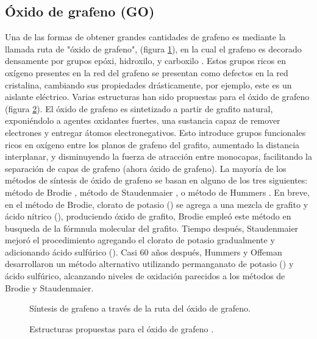 \subsection{Óxido de grafeno (GO)}
Una de las formas de obtener grandes cantidades de grafeno es mediante la llamada ruta de "óxido de grafeno", (figura \ref{fig:graphiteToRGO}), en la cual el grafeno es decorado densamente por grupos epóxi, hidroxilo, y carboxilo \citep{Dreyer2010}. Estos grupos ricos en oxígeno presentes en la red del grafeno se presentan como defectos en la red cristalina, cambiando sus propiedades drásticamente, por ejemplo, este es un aislante eléctrico. Varias estructuras han sido propuestas para el óxido de grafeno (figura \ref{fig:GO_structure}).
El óxido de grafeno es sintetizado a partir de grafito natural, exponiéndolo a agentes oxidantes fuertes, una sustancia capaz de remover electrones y entregar átomos electronegativos. Esto introduce grupos funcionales ricos en oxígeno entre los planos de grafeno del grafito, aumentado la distancia interplanar, y disminuyendo la fuerza de atracción entre monocapas, facilitando la separación de capas de grafeno (ahora óxido de grafeno). La mayoría de los métodos de síntesis de óxido de grafeno se basan en alguno de los tres siguientes: método de Brodie \citep{Brodie1859}, método de Staudenmaier \citep{Staudenmaier1898}, o método de Hummers \citep{Hummers1958}. En breve, en el método de Brodie, clorato de potasio () se agrega a una mezcla de grafito y ácido nítrico (), produciendo óxido de grafito, Brodie empleó este método en busqueda de la fórmnula molecular del grafito. Tiempo después, Staudenmaier mejoró el procedimiento agregando el clorato de potasio gradualmente y adicionando ácido sulfúrico (). Casi 60 años después, Hummers y Offeman desarrollaron un método alternativo utilizando permanganato de potasio () y ácido sulfúrico, alcanzando niveles de oxidación parecidos a los métodos de Brodie y Staudenmaier.
\begin{figure}
	\centering
	\caption[Síntesis de grafeno a través de la ruta del óxido de grafeno]{Síntesis de grafeno a través de la ruta del óxido de grafeno.}
	\label{fig:graphiteToRGO}
\end{figure}

\begin{figure}
	\centering
	\caption[Estructura de óxido de grafeno]{Estructuras propuestas para el óxido de grafeno \citep{Dreyer2010}.}
	\label{fig:GO_structure}
\end{figure}


